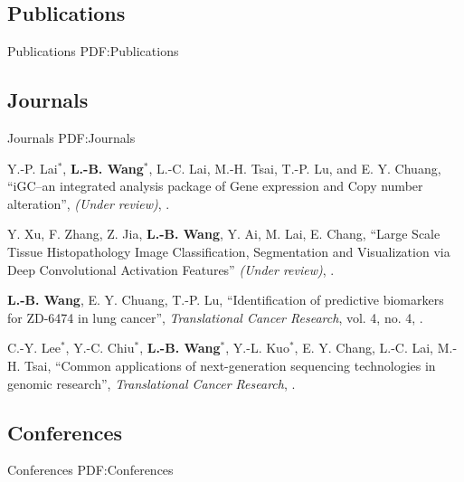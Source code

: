 \documentclass[a4paper,10pt,oneside]{article}
\begin{document}
\begin{body}

\section
{Publications}
{Publications}
{PDF:Publications}

\subsection
{Journals}
{Journals}
{PDF:Journals}

\begin{publication}[series=pub, widest*=100]

    \item Y.-P. Lai$^*$, \textbf{L.-B. Wang}$^*$, L.-C. Lai, M.-H. Tsai, T.-P. Lu, and E. Y. Chuang,
        ``iGC–an integrated analysis package of Gene expression and Copy number alteration'',
        \textit{(Under review)},
        .

    \item
        Y. Xu, F. Zhang, Z. Jia, \textbf{L.-B. Wang}, Y. Ai, M. Lai, E. Chang,
        ``Large Scale Tissue Histopathology Image Classification, Segmentation and Visualization via Deep Convolutional Activation Features''
        \textit{(Under review)},
        .

    \item
        \textbf{L.-B. Wang}, E. Y. Chuang, T.-P. Lu,
        ``Identification of predictive biomarkers for ZD-6474 in lung cancer'',
        \textit{Translational Cancer Research}, vol. 4, no. 4,
        .

    \item
        C.-Y. Lee$^*$, Y.-C. Chiu$^*$, \textbf{L.-B. Wang}$^*$, Y.-L. Kuo$^*$, E. Y. Chang, L.-C. Lai, M.-H. Tsai,
        ``Common applications of next-generation sequencing technologies in genomic research'',
        \textit{Translational Cancer Research},
        .

\end{publication}
\BigEntryGap

\subsection
{Conferences}
{Conferences}
{PDF:Conferences}

\begin{publication}[widest*=100]  %


\end{publication}
\end{body}
\end{document}
